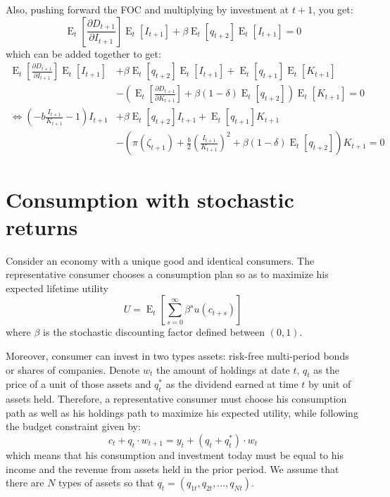 \documentclass[12pt]{report}
\newcommand{\Et}[1]{\operatorname{E}_t\left[#1\right]}
\begin{document}
Also, pushing forward the FOC and multiplying by investment at $t+1$, you get: $$ \Et{\frac{\partial D_{t+1}}{\partial I_{t+1}}}\Et{I_{t+1}} + \beta \Et{q_{t+2}} \Et{I_{t+1}} = 0 $$
which can be added together to get:\begin{align*}
\Et{\frac{\partial D_{t+1}}{\partial I_{t+1}}}\Et{I_{t+1}} & + \beta \Et{q_{t+2}} \Et{I_{t+1}} +  \Et{q_{t+1}}\Et{K_{t+1}} \\
& - \left(\Et{\frac{\partial D_{t+1}}{\partial K_{t+1}}} + \beta(1-\delta)\Et{q_{t+2}}\right)\Et{K_{t+1}} = 0 \\ \Leftrightarrow \left( -b\frac{I_{t+1}}{K_{t+1}} - 1 \right)I_{t+1} & + \beta \Et{q_{t+2}} I_{t+1} +  \Et{q_{t+1}} K_{t+1} \\ & - \left(\pi(\zeta_{t+1}) + \frac{b}{2}\left(\frac{I_{t+1}}{K_{t+1}}\right)^2 + \beta(1-\delta)\Et{q_{t+2}}\right)K_{t+1} = 0 
\end{align*}

\section{Consumption with stochastic returns}

Consider an economy with a unique good and identical consumers. The representative consumer chooses a consumption plan so as to maximize his expected lifetime utility $$U = \Et{\sum_{s=0}^{\infty} \beta^{s} u(c_{t+s})} $$ where $\beta$ is the stochastic discounting factor defined between $(0,1)$.

Moreover, consumer can invest in two types assets: risk-free multi-period bonds or shares of companies. Denote $w_t$ the amount of holdings at date $t$, $q_t$ as the price of a unit of those assets and $q_t^*$ as the dividend earned at time $t$ by unit of assets held. Therefore, a representative consumer must choose his consumption path as well as his holdings path to maximize his expected utility, while following the budget constraint given by: $$c_t + q_t\cdot w_{t+1} = y_t + (q_t + q_t^*)\cdot w_t $$ which means that his consumption and investment today must be equal to his income and the revenue from assets held in the prior period. We assume that there are $N$ types of assets so that $q_t = (q_{1t}, q_{2t}, ..., q_{Nt})$.
\end{document}
